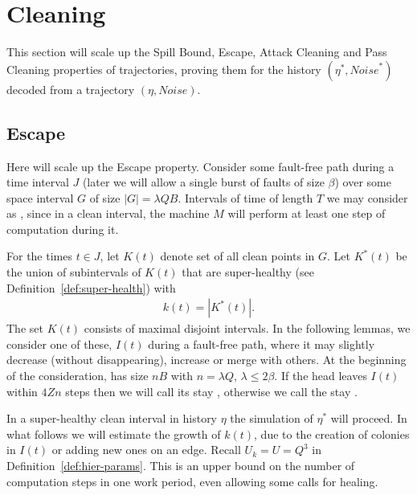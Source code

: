 \documentclass[11pt]{memoir}
\theoremstyle{definition} %
\renewcommand{\le}{\leq}
\def\B{B}
\def\U{U}
\newcommand{\Noise}{\mathit{Noise}}
\newcommand{\Q}{Q} %
\newcommand{\Tu}{T}
\newcommand{\Z}{Z} %
\begin{document}
\section{Cleaning}\label{sec:cleaning}

This section will scale up the Spill Bound, Escape, Attack Cleaning
and Pass Cleaning properties of trajectories, proving them for the history \( (\eta^{*},\Noise^{*}) \)
decoded from a trajectory \( (\eta,\Noise) \).

\subsection{Escape}\label{sec:escape}

Here will scale up the Escape property.
Consider some fault-free path during a time interval \( J \) (later we will allow a single
burst of faults of size \( \beta \))
over some space interval \( G \) of size \( |G|=\lambda\Q\B \).
Intervals of time of length \( \Tu \)
we may consider as , since in a clean interval, the machine \( M \)
will perform at least one step of computation during it.

\begin{definition}\label{def:K(t)}
  For the times \( t\in J \), let \( K(t) \) denote set of all clean points in \( G \).
  Let \( K^{*}(t) \) be the union of subintervals of \( K(t) \) that are
  super-healthy (see Definition~\ref{def:super-health}) with
\begin{align*}
 k(t)=|K^{*}(t)| .
\end{align*}
The set \( K(t) \) consists of maximal disjoint intervals.
In the following lemmas, we consider one of these, \( I(t) \) during a fault-free path,
where it may slightly decrease (without disappearing), increase or merge with others.
At the beginning of the consideration, has
size \( n\B \) with \( n=\lambda\Q \),  \( \lambda\le 2\beta \).
If the head leaves \( I(t) \) within \( 4\Z n \) steps then we will call its stay ,
otherwise we call the stay .
\end{definition}

In a super-healthy clean interval in history \( \eta \) the simulation of \( \eta^{*} \) will proceed.
In what follows we will estimate the growth of \( k(t) \), due to the creation
of colonies in \( I(t) \) or adding new ones on an edge.
Recall  \( \U_{k} = \U =\Q^{3} \) in Definition~\ref{def:hier-params}.
This is an upper bound on the number of computation steps in one work period, even allowing some
calls for healing.
\end{document}
